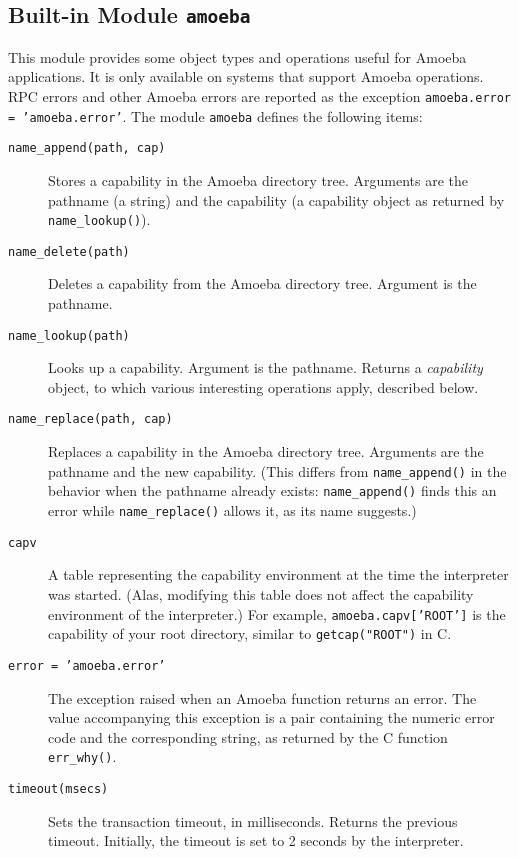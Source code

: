 \subsection{Built-in Module {\tt amoeba}}

This module provides some object types and operations useful for
Amoeba applications.
It is only available on systems that support Amoeba operations.
RPC errors and other Amoeba errors are reported as the exception
{\tt amoeba.error = 'amoeba.error'}.
The module
{\tt amoeba}
defines the following items:
\begin{description}
\item[{\tt name\_append(path,~cap)}]
Stores a capability in the Amoeba directory tree.
Arguments are the pathname (a string) and the capability (a capability
object as returned by
{\tt name\_lookup()}).
\item[{\tt name\_delete(path)}]
Deletes a capability from the Amoeba directory tree.
Argument is the pathname.
\item[{\tt name\_lookup(path)}]
Looks up a capability.
Argument is the pathname.
Returns a
{\em capability}
object, to which various interesting operations apply, described below.
\item[{\tt name\_replace(path,~cap)}]
Replaces a capability in the Amoeba directory tree.
Arguments are the pathname and the new capability.
(This differs from
{\tt name\_append()}
in the behavior when the pathname already exists:
{\tt name\_append()}
finds this an error while
{\tt name\_replace()}
allows it, as its name suggests.)
\item[{\tt capv}]
A table representing the capability environment at the time the
interpreter was started.
(Alas, modifying this table does not affect the capability environment
of the interpreter.)
For example,
{\tt amoeba.capv['ROOT']}
is the capability of your root directory, similar to
{\tt getcap("ROOT")}
in C.
\item[{\tt error = 'amoeba.error'}]
The exception raised when an Amoeba function returns an error.
The value accompanying this exception is a pair containing the numeric
error code and the corresponding string, as returned by the C function
{\tt err\_why()}.
\item[{\tt timeout(msecs)}]
Sets the transaction timeout, in milliseconds.
Returns the previous timeout.
Initially, the timeout is set to 2 seconds by the {\Python} interpreter.
\end{description}

